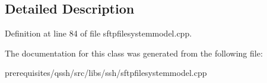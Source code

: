 \subsection{Detailed Description}


Definition at line 84 of file sftpfilesystemmodel.\+cpp.



The documentation for this class was generated from the following file\+:\begin{DoxyCompactItemize}
\item 
prerequisites/qssh/src/libs/ssh/sftpfilesystemmodel.\+cpp\end{DoxyCompactItemize}
